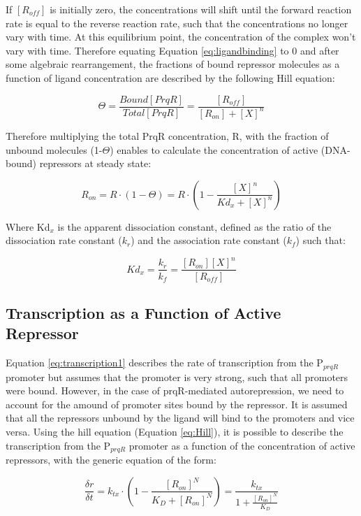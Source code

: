 If $[R_{off}]$ is initially zero, the concentrations will shift until the forward reaction rate is equal to the reverse reaction rate, such that the concentrations no longer vary with time. At this equilibrium point, the concentration of the complex won’t vary with time. Therefore equating Equation \ref{eq:ligandbinding} to 0 and after some algebraic rearrangement, the fractions of bound repressor molecules as a function of ligand concentration are described by the following Hill equation:

\begin{equation}
\label{eq:Hill}
    \Theta = \frac{Bound [PrqR]}{Total [PrqR]} =  \frac{[R_{off}]}{[R_{on}] + [X]^{n}}
\end{equation}

Therefore multiplying the total PrqR concentration, R, with the fraction of unbound molecules (1-$\Theta$) enables to calculate the concentration of active (DNA-bound) repressors at steady state:

\begin{equation}
\label{eq:Ron}
	R_{on} = R\cdot(1-\Theta) = R\cdot(1 - \frac{[X]^n}{Kd_{x} + [X]^n})
\end{equation}

Where  Kd$_{x}$  is the apparent dissociation constant, defined as the ratio of the dissociation rate constant ($k_{r}$) and the association rate constant ($k_{f}$) such that:

\begin{equation}
	Kd_{x} = \frac{k_{r}}{k_{f}} = \frac{[R_{on}][X]^n}{[R_{off}]}
\end{equation}

\subsection{Transcription as a Function of Active Repressor}
Equation \ref{eq:transcription1} describes the rate of transcription from the P$_{prqR}$ promoter but assumes that the promoter is very strong, such that all promoters were bound. However, in the case of prqR-mediated autorepression, we need to account for the amound of promoter sites bound by the repressor. It is assumed that all the repressors unbound by the ligand will bind to the promoters and vice versa.  Using the hill equation (Equation \ref{eq:Hill}), it is possible to describe the transcription from the P$_{prqR}$ promoter as a function of the concentration of active repressors, with the generic equation of the form:

\begin{equation}
\label{eq:transrep2}
    \frac{\delta r}{\delta t} = k_{tx} \cdot (1 - \frac{[R_{on}]^{N}}{K_D + [R_{on}]^{N}}) = \frac{k_{tx}}{1 + \frac{[R_{on}]^N}{K_D}}
\end{equation}

